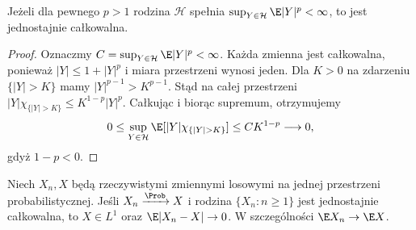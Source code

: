 \begin{stwierdzenie}
Jeżeli dla pewnego $p>1$ rodzina $\mathcal H$ spełnia
$\sup_{Y\in\mathcal H}\E|Y|^p<\infty$,
to jest jednostajnie całkowalna.
\end{stwierdzenie}
\begin{proof}
Oznaczmy $C=\sup_{Y\in\mathcal H}\E|Y|^p<\infty$.
Każda zmienna jest całkowalna, ponieważ
$|Y|\leq1+|Y|^p$ i miara przestrzeni wynosi jeden.
Dla $K>0$ na zdarzeniu $\{|Y|>K\}$ mamy
$|Y|^{p-1}>K^{p-1}$. Stąd na całej przestrzeni
$|Y|\chi_{\{|Y|>K\}}\leq K^{1-p}|Y|^p$.
Całkując i biorąc supremum, otrzymujemy
\[
0\leq\sup_{Y\in\mathcal H}\E[|Y|\chi_{\{|Y|>K\}}]
\leq CK^{1-p}\longrightarrow0,
\]
gdyż $1-p<0$.
\end{proof}

\begin{twierdzenie}
Niech $X_n,X$ będą rzeczywistymi zmiennymi losowymi
na jednej przestrzeni probabilistycznej.
Jeśli $X_n\xrightarrow{\Prob}X$ i rodzina
$\{X_n:n\geq1\}$ jest jednostajnie całkowalna,
to $X\in L^1$ oraz $\E|X_n-X|\to0$.
W szczególności $\E X_n\to\E X$.
\end{twierdzenie}
